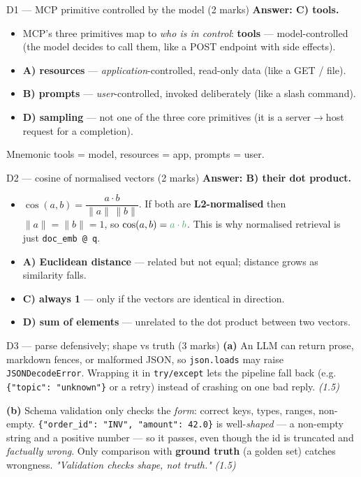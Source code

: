\documentclass[aspectratio=169,11pt]{beamer}
\begin{document}
\begin{frame}{D1 --- MCP primitive controlled by the model (2 marks)}
\textbf{Answer: C) tools.}
\begin{itemize}
  \item MCP's three primitives map to \emph{who is in control}: \textcolor{cgreen}{\textbf{tools} ---
        model-controlled} (the model decides to call them, like a POST endpoint with side effects).
  \item \textbf{A) resources} --- \emph{application}-controlled, read-only data (like a GET / file).
  \item \textbf{B) prompts} --- \emph{user}-controlled, invoked deliberately (like a slash command).
  \item \textbf{D) sampling} --- not one of the three core primitives (it is a server$\to$host request
        for a completion).
\end{itemize}
\begin{block}{Mnemonic}
\footnotesize tools = model, resources = app, prompts = user.
\end{block}
\end{frame}

\begin{frame}{D2 --- cosine of normalised vectors (2 marks)}
\textbf{Answer: B) their dot product.}
\begin{itemize}
  \item $\cos(a,b)=\dfrac{a\cdot b}{\lVert a\rVert\,\lVert b\rVert}$. If both are
        \textbf{L2-normalised} then $\lVert a\rVert=\lVert b\rVert=1$, so
        $\cos(a,b)=\textcolor{cgreen}{a\cdot b}$. This is why normalised retrieval is just
        \texttt{doc\_emb @ q}.
  \item \textbf{A) Euclidean distance} --- related but not equal; distance grows as similarity falls.
  \item \textbf{C) always 1} --- only if the vectors are identical in direction.
  \item \textbf{D) sum of elements} --- unrelated to the dot product between two vectors.
\end{itemize}
\end{frame}

\begin{frame}{D3 --- parse defensively; shape vs truth (3 marks)}
\textbf{(a)} An LLM can return prose, markdown fences, or malformed JSON, so \texttt{json.loads}
may raise \texttt{JSONDecodeError}. Wrapping it in \texttt{try/except} lets the pipeline
\textcolor{cgreen}{fall back} (e.g. \texttt{\{"topic": "unknown"\}} or a retry) instead of
crashing on one bad reply. \hfill \emph{(1.5)}

\textbf{(b)} Schema validation only checks the \emph{form}: correct keys, types, ranges,
non-empty. \texttt{\{"order\_id": "INV", "amount": 42.0\}} is well-\emph{shaped} --- a non-empty
string and a positive number --- so it \textcolor{cgreen}{passes}, even though the id is truncated
and \emph{factually wrong}. Only comparison with \textbf{ground truth} (a golden set) catches
wrongness. \emph{"Validation checks shape, not truth."} \hfill \emph{(1.5)}
\end{frame}
\end{document}
